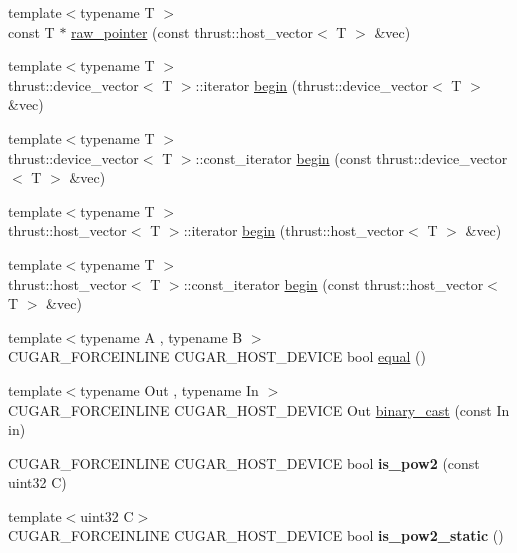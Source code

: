 \begin{DoxyCompactItemize}
\item 
{\footnotesize template$<$typename T $>$ }\\const T $\ast$ \hyperlink{namespacecugar_abb8f6f9017ebeaf8886659425e9a0d11}{raw\+\_\+pointer} (const thrust\+::host\+\_\+vector$<$ T $>$ \&vec)
\item 
{\footnotesize template$<$typename T $>$ }\\thrust\+::device\+\_\+vector$<$ T $>$\+::iterator \hyperlink{namespacecugar_a2121df08f967e232ea5fe0ee378dee67}{begin} (thrust\+::device\+\_\+vector$<$ T $>$ \&vec)
\item 
{\footnotesize template$<$typename T $>$ }\\thrust\+::device\+\_\+vector$<$ T $>$\+::const\+\_\+iterator \hyperlink{namespacecugar_a30af53814c4976acd3bacabbbd2993fa}{begin} (const thrust\+::device\+\_\+vector$<$ T $>$ \&vec)
\item 
{\footnotesize template$<$typename T $>$ }\\thrust\+::host\+\_\+vector$<$ T $>$\+::iterator \hyperlink{namespacecugar_a8a6b151a6640c04a23f3cacd28439630}{begin} (thrust\+::host\+\_\+vector$<$ T $>$ \&vec)
\item 
{\footnotesize template$<$typename T $>$ }\\thrust\+::host\+\_\+vector$<$ T $>$\+::const\+\_\+iterator \hyperlink{namespacecugar_a78dcc4dcd287c31dd89c0e0f0fb22ebe}{begin} (const thrust\+::host\+\_\+vector$<$ T $>$ \&vec)
\item 
{\footnotesize template$<$typename A , typename B $>$ }\\C\+U\+G\+A\+R\+\_\+\+F\+O\+R\+C\+E\+I\+N\+L\+I\+NE C\+U\+G\+A\+R\+\_\+\+H\+O\+S\+T\+\_\+\+D\+E\+V\+I\+CE bool \hyperlink{group___basic_meta_functions_ga939b5b82e4150264a08ce1d37404f914}{equal} ()
\item 
{\footnotesize template$<$typename Out , typename In $>$ }\\C\+U\+G\+A\+R\+\_\+\+F\+O\+R\+C\+E\+I\+N\+L\+I\+NE C\+U\+G\+A\+R\+\_\+\+H\+O\+S\+T\+\_\+\+D\+E\+V\+I\+CE Out \hyperlink{group___basic_utils_ga27a8f4df38255278583c8b582a7912bd}{binary\+\_\+cast} (const In in)
\item 
C\+U\+G\+A\+R\+\_\+\+F\+O\+R\+C\+E\+I\+N\+L\+I\+NE C\+U\+G\+A\+R\+\_\+\+H\+O\+S\+T\+\_\+\+D\+E\+V\+I\+CE bool {\bfseries is\+\_\+pow2} (const uint32 C)
\item 
{\footnotesize template$<$uint32 C$>$ }\\C\+U\+G\+A\+R\+\_\+\+F\+O\+R\+C\+E\+I\+N\+L\+I\+NE C\+U\+G\+A\+R\+\_\+\+H\+O\+S\+T\+\_\+\+D\+E\+V\+I\+CE bool {\bfseries is\+\_\+pow2\+\_\+static} ()

\end{DoxyCompactItemize}
